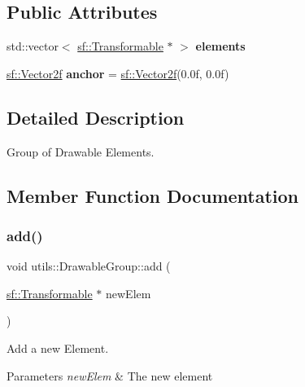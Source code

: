 \subsection*{Public Attributes}
\begin{DoxyCompactItemize}
\item 
\mbox{\label{structutils_1_1_drawable_group_afb62eafed0256355e10fa199f4115533}} 
std\+::vector$<$ \mbox{\hyperlink{classsf_1_1_transformable}{sf\+::\+Transformable}} $\ast$ $>$ {\bfseries elements}
\item 
\mbox{\label{structutils_1_1_drawable_group_a07f664e911cd4c4c6a508234655af396}} 
\mbox{\hyperlink{classsf_1_1_vector2}{sf\+::\+Vector2f}} {\bfseries anchor} = \mbox{\hyperlink{classsf_1_1_vector2}{sf\+::\+Vector2f}}(0.\+0f, 0.\+0f)
\end{DoxyCompactItemize}


\subsection{Detailed Description}
Group of Drawable Elements. 

\subsection{Member Function Documentation}
\mbox{\label{structutils_1_1_drawable_group_a941d5d27a0fd5d712f833df263c72dce}} 
\subsubsection{\texorpdfstring{add()}{add()}}
{\footnotesize\ttfamily void utils\+::\+Drawable\+Group\+::add (\begin{DoxyParamCaption}\item[{\mbox{\hyperlink{classsf_1_1_transformable}{sf\+::\+Transformable}} $\ast$}]{new\+Elem }\end{DoxyParamCaption})\hspace{0.3cm}{\ttfamily [inline]}}



Add a new Element. 


\begin{DoxyParams}{Parameters}
{\em new\+Elem} & The new element \\
\hline
\end{DoxyParams}
\mbox{\label{structutils_1_1_drawable_group_ae7d89c917c5758ac7e9020f332b2b9d8}} 
